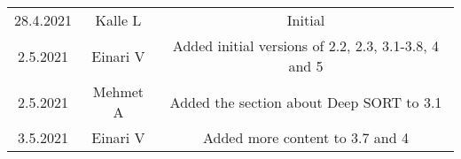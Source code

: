 \begin{center}
	\begin{tabular}{ c c c }
		28.4.2021 & Kalle L & Initial \\ 
		2.5.2021 & Einari V & Added initial versions of 2.2, 2.3, 3.1-3.8, 4 and 5 \\
		2.5.2021 & Mehmet A & Added the section about Deep SORT to 3.1 \\
		3.5.2021 & Einari V & Added more content to 3.7 and 4\\
	\end{tabular}
\end{center}